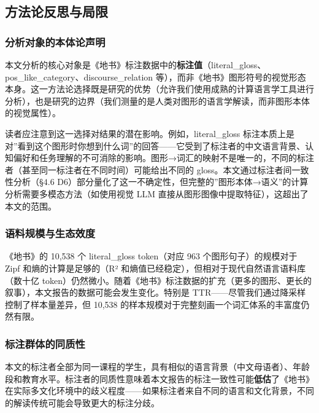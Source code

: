 \documentclass[12pt,a4paper,UTF8,fontset=founder]{ctexart}
\begin{document}
\subsection{方法论反思与局限}\label{ux65b9ux6cd5ux8bbaux53cdux601dux4e0eux5c40ux9650}

\subsubsection{分析对象的本体论声明}\label{ux5206ux6790ux5bf9ux8c61ux7684ux672cux4f53ux8bbaux58f0ux660e}

本文分析的核心对象是《地书》标注数据中的\textbf{标注值}（literal\_gloss、pos\_like\_category、discourse\_relation 等），而非《地书》图形符号的视觉形态本身。这一方法论选择既是研究的优势（允许我们使用成熟的计算语言学工具进行分析），也是研究的边界（我们测量的是人类对图形的语言学解读，而非图形本体的视觉属性）。

读者应注意到这一选择对结果的潜在影响。例如，literal\_gloss 标注本质上是对''看到这个图形时你想到什么词''的回答------它受到了标注者的中文语言背景、认知偏好和任务理解的不可消除的影响。图形→词汇的映射不是唯一的，不同的标注者（甚至同一标注者在不同时间）可能给出不同的 gloss。本文通过标注者间一致性分析（§$4.6$ D6）部分量化了这一不确定性，但完整的''图形本体→语义''的计算分析需要多模态方法（如使用视觉 LLM 直接从图形图像中提取特征），这超出了本文的范围。

\subsubsection{语料规模与生态效度}\label{ux8bedux6599ux89c4ux6a21ux4e0eux751fux6001ux6548ux5ea6}

《地书》的 10,538 个 literal\_gloss token（对应 963 个图形句子）的规模对于 Zipf 和熵的计算是足够的（R² 和熵值已经稳定），但相对于现代自然语言语料库（数十亿 token）仍然微小。随着《地书》标注数据的扩充（更多的图形、更长的叙事），本文报告的数据可能会发生变化。特别是 TTR------尽管我们通过降采样控制了样本量差异，但 10,538 的样本规模对于完整刻画一个词汇体系的丰富度仍然有限。

\subsubsection{标注群体的同质性}\label{ux6807ux6ce8ux7fa4ux4f53ux7684ux540cux8d28ux6027}

本文的标注者全部为同一课程的学生，具有相似的语言背景（中文母语者）、年龄段和教育水平。标注者的同质性意味着本文报告的标注一致性可能\textbf{低估}了《地书》在实际多文化环境中的歧义程度------如果标注者来自不同的语言和文化背景，不同的解读传统可能会导致更大的标注分歧。
\end{document}

